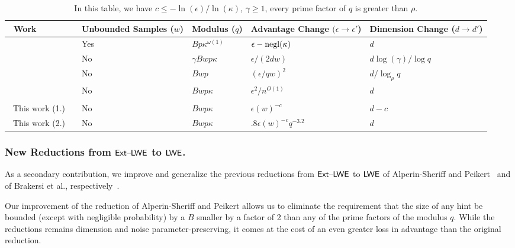 \begin{table}[!h]
\begin{tabular}{| p{2.5cm} | p{2cm} | p{2cm} | p{2.5cm} | p{2.5cm} |}
\hline
~\textbf{Work} & \textbf{Unbounded Samples} ($w$) & \textbf{Modulus} ($q$) & \textbf{Advantage
                                                Change} $(\epsilon\rightarrow\epsilon'$) & \textbf{Dimension Change} ($d\rightarrow d'$) \\
\hline
~\cite{DBLP:conf/eurocrypt/BanerjeePR12} & Yes &
                                                                $Bp\kappa^{\omega(1)}$&$\epsilon-\operatorname{negl}(\kappa)$&$d$\\
\hline
~\cite{DBLP:conf/crypto/AlwenKPW13} & No & $\gamma
                                           Bwp\kappa$&$\epsilon/(2dw)$&$d\log(\gamma)/\log{q}$\\
\hline
~\cite{DBLP:conf/tcc/BogdanovGMRR16} & No &
                                            $Bwp$&$(\epsilon/qw)^2$&$d/\log_{\rho}{q}$\\
\hline
~\cite{DBLP:conf/asiacrypt/BaiLLSS15}& No & $Bwp \kappa$&$\epsilon^2/n^{O(1)}$&$d$\\
\hline&&&&\\[-2.6ex]
\hline
~This work (1.)~~ & No & $Bwp\kappa$&$\epsilon(w)^{-c}$&$d-c$\\
~This work (2.)~~ & No & $Bwp\kappa$&$.8\epsilon(w)^{-c}q^{-3.2}$&$d$\\
\hline
\end{tabular}
\caption{In this table, we have $c \leq -\ln(\epsilon)/\ln(\kappa)$, $\gamma \geq
1$, every prime factor of $q$ is greater than $\rho$.}\label{tab1}
\end{table}

\vspace{-40pt}
\subsubsection{New Reductions from $\mathsf{Ext \text{\textendash} LWE}$ to $\mathsf{LWE}$.}
\label{sec:new-ext}
 As a secondary contribution,
we improve and generalize the previous reductions from $\mathsf{Ext \text{\textendash} LWE}$ to
$\mathsf{LWE}$ of Alperin-Sheriff and
Peikert~\cite{DBLP:conf/pkc/Alperin-SheriffP12} and of Brakersi et
al., respectively~\cite{DBLP:conf/stoc/BrakerskiLPRS13}.

Our improvement of the reduction of Alperin-Sheriff and Peikert allows
us to eliminate the requirement that the size of any hint be bounded
(except with negligible probability) by a
$B$ smaller by a factor of 2 than any of the prime factors of the modulus $q$. While
the reductions remains dimension and noise parameter-preserving, it
comes at the cost of an even greater loss in advantage than the
original reduction. 

